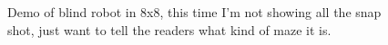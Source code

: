 \documentclass{article}
\begin{document}
\begin{figure}[!t]
\normalsize
\centering
{}
\caption{Demo of blind robot in 8x8, this time I'm not showing all the snap shot, just want to tell the readers what kind of maze it is.}
\label{b-3} %
\end{figure}
\end{document}
